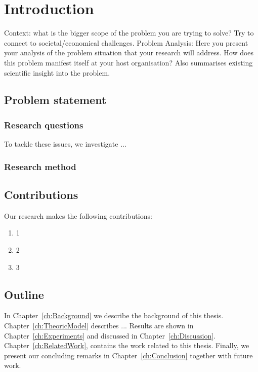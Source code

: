\chapter{Introduction}\label{ch:Introduction}

Context: what is the bigger scope of the problem you are trying to solve? Try to connect to societal/economical challenges.
Problem Analysis: Here you present your analysis of the problem situation that your research will address.
How does this problem manifest itself at your host organisation?
Also summarises existing scientific insight into the problem.


\section{Problem statement}


\subsection{Research questions}
To tackle these issues, we investigate ...

\subsection{Research method}


\section{Contributions}
Our research makes the following contributions:
\begin{enumerate}
	\item 1
	\item 2
	\item 3
\end{enumerate}

\section{Outline}
In Chapter~\ref{ch:Background} we describe the background of this thesis.
Chapter~\ref{ch:TheoricModel} describes ...
Results are shown in Chapter~\ref{ch:Experiments} and discussed in Chapter~\ref{ch:Discussion}. Chapter~\ref{ch:RelatedWork}, contains the work related to this thesis.
Finally, we present our concluding remarks in Chapter~\ref{ch:Conclusion} together with future work.

